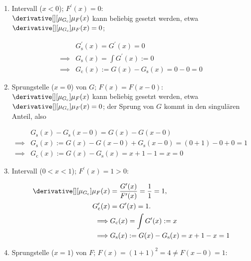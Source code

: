 \begin{solution}
\begin{enumerate}

    \item Intervall ($x < 0$); $F^\prime(x) = 0$: \\
    $\derivative[][\mu_{G_\mathrm{c}}]{\mu_F}(x)$ kann beliebig gesetzt werden, etwa $\derivative[][\mu_{G_\mathrm{c}}]{\mu_F}(x) = 0$;

    \begin{align*}
        &
        G_\mathrm{s}^\prime(x) = G^\prime(x) = 0 \\
        \implies &
        G_\mathrm{s}(x) = \int G^\prime(x) := 0 \\
        \implies &
        G_\mathrm{c}(x) := G(x) - G_\mathrm{s}(x) = 0 - 0 = 0
    \end{align*}

    \item Sprungstelle ($x = 0$) von $G$; $F(x) = F(x - 0)$: \\
    $\derivative[][\mu_{G_\mathrm{c}}]{\mu_F}(x)$ kann beliebig gesetzt werden, etwa $\derivative[][\mu_{G_\mathrm{c}}]{\mu_F}(x) = 0$;
    der Sprung von $G$ kommt in den singulären Anteil, also

    \begin{align*}
        &
        G_\mathrm{s}(x) - G_\mathrm{s}(x - 0) = G(x) - G(x - 0) \\
        \implies &
        G_\mathrm{s}(x) := G(x) - G(x - 0) + G_\mathrm{s}(x - 0) = (0 + 1) - 0 + 0 = 1 \\
        \implies &
        G_\mathrm{c}(x) := G(x) - G_\mathrm{s}(x) = x + 1 - 1 = x = 0
    \end{align*}

    \item Intervall ($0 < x < 1$); $F^\prime(x) = 1 > 0$:
    
    \begin{align*}
        \derivative[][\mu_{G_\mathrm{c}}]{\mu_F}(x) & = \frac{G^\prime(x)}{F^\prime(x)} = \frac{1}{1} = 1, \\
        G_\mathrm{c}^\prime(x) & = G^\prime(x) = 1. \\
        \implies &
        G_\mathrm{c}(x) = \int G^\prime(x) := x \\
        \implies &
        G_\mathrm{s}(x) := G(x) - G_\mathrm{s}(x) = x + 1 - x = 1
    \end{align*}

    \item Sprungstelle ($x = 1$) von $F$; $F(x) = (1 + 1)^2 = 4 \neq F(x - 0) = 1$:
    

\end{enumerate}
\end{solution}
